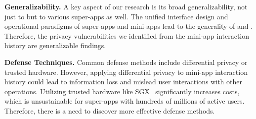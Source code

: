 \noindent \textbf{Generalizability.} A key aspect of our research is its broad generalizability, not just to \alipay but to various super-apps as well. The unified interface design and operational paradigms of super-apps and mini-apps lead to the generality of \mini and \op. Therefore, the privacy vulnerabilities we identified from the mini-app interaction history are generalizable findings.




\noindent \textbf{Defense Techniques.} Common defense methods include differential privacy or trusted hardware. However, applying differential privacy to mini-app interaction history could lead to information loss and mislead user interactions with other operations. Utilizing trusted hardware like SGX~\cite{273705} significantly increases costs, which is unsustainable for super-apps with hundreds of millions of active users. Therefore, there is a need to discover more effective defense methods.

